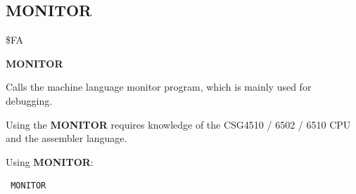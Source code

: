 
\newpage
\subsection{MONITOR}
\begin{description}[leftmargin=2cm,style=nextline]
\item [Token:] \$FA
\item [Format:] {\bf MONITOR}
\item [Usage:]  Calls the machine language
                monitor program, which is mainly used for
                debugging.

\item [Remarks:] Using the {\bf MONITOR} requires knowledge
                 of the CSG4510 / 6502 / 6510 CPU and
                 the assembler language.

\item [Example:] Using {\bf MONITOR}:
\begin{tcolorbox}[colback=black,coltext=white]
\verbatimfont{\codefont}
\begin{verbatim}
 MONITOR
\end{verbatim}
\end{tcolorbox}
\end{description}


\newpage
